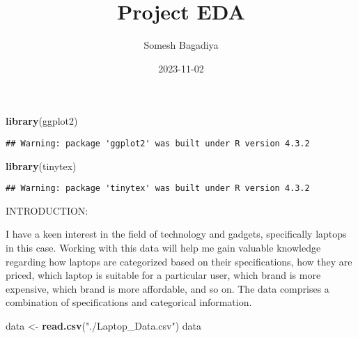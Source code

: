 \documentclass[
]{article}
\title{Project EDA}
\author{Somesh Bagadiya}
\date{2023-11-02}
\newenvironment{Shaded}{\begin{snugshade}}{\end{snugshade}}
\newcommand{\FunctionTok}[1]{\textcolor[rgb]{0.13,0.29,0.53}{\textbf{#1}}}
\newcommand{\NormalTok}[1]{#1}
\newcommand{\OtherTok}[1]{\textcolor[rgb]{0.56,0.35,0.01}{#1}}
\newcommand{\StringTok}[1]{\textcolor[rgb]{0.31,0.60,0.02}{#1}}
\begin{document}
\maketitle

\begin{Shaded}
\begin{Highlighting}[]
\FunctionTok{library}\NormalTok{(ggplot2)}
\end{Highlighting}
\end{Shaded}

\begin{verbatim}
## Warning: package 'ggplot2' was built under R version 4.3.2
\end{verbatim}

\begin{Shaded}
\begin{Highlighting}[]
\FunctionTok{library}\NormalTok{(tinytex)}
\end{Highlighting}
\end{Shaded}

\begin{verbatim}
## Warning: package 'tinytex' was built under R version 4.3.2
\end{verbatim}

INTRODUCTION:

I have a keen interest in the field of technology and gadgets,
specifically laptops in this case. Working with this data will help me
gain valuable knowledge regarding how laptops are categorized based on
their specifications, how they are priced, which laptop is suitable for
a particular user, which brand is more expensive, which brand is more
affordable, and so on. The data comprises a combination of
specifications and categorical information.

\begin{Shaded}
\begin{Highlighting}[]
\NormalTok{data }\OtherTok{\textless{}{-}} \FunctionTok{read.csv}\NormalTok{(}\StringTok{"./Laptop\_Data.csv"}\NormalTok{)}
\NormalTok{data}
\end{Highlighting}
\end{Shaded}
\end{document}
